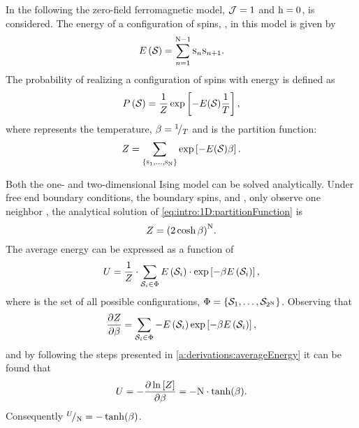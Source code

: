 	In the following the zero-field ferromagnetic model, \ie \mbox{$\mathcal{J} = 1$} and \mbox{$\mathrm{h} = 0$}, is considered. The energy \energy of a configuration of spins, \configuration{}, in this model is given by 
	\begin{equation*}
		E\left(\mathcal{S}_{}\right) = \sum_{n = 1}^{\mathrm{N} - 1}\textsc{s}_{n}\textsc{s}_{n+1}.
	\end{equation*}
	The probability of realizing a configuration of spins \configuration{} with energy \energy is defined as
	\begin{equation}
		\label{eq:intro:1D:configurationProbability}
		P\left(\mathcal{S}_{}\right) = 
		\frac{1}{Z} \exp\left[-{E(\mathcal{S}_{})}\frac{1}{T}\right],
	\end{equation}
	where \temperature represents the temperature, $\beta = {}^{1}\!/_{T}$ and \partitionfunction is the partition function:
	\begin{equation}
		\label{eq:intro:1D:partitionFunction}
		Z = \sum_{\left\{\textsc{s}_{1}, \dotsc, \textsc{s}_{\mathrm{N}} \right\}} \exp\left[- {E(\mathcal{S}_{})} \beta \right].
	\end{equation}

	Both the one- and two-dimensional Ising model can be solved analytically. Under free end boundary conditions, \ie the boundary spins,  and \spin{\numberOfSpins}, only observe one neighbor \cite{landau2014guide}, the analytical solution of \cref{eq:intro:1D:partitionFunction} is
	\begin{equation}
		\label{eq:introduced1D:partitionFunctionAnalyticalSolution}
		Z = {(2 \cosh \beta)}^\mathrm{N}.
	\end{equation}
	The average energy can be expressed as a function of \partitionfunction \cite{Murray20011Handout}
	\begin{equation*}
		U = \frac{1}{Z} \cdot \sum_{\mathcal{S}_{i} \in \Phi} E\left(\mathcal{S}_{i}\right) \cdot \exp\left[-\beta E\left(\mathcal{S}_{i}\right) \right],
	\end{equation*} 
	where \allPossibleConfigurations is the set of all possible configurations, \ie $\Phi = \left\{\mathcal{S}_{1}, \dotsc, \mathcal{S}_{2^\mathrm{N}}\right\}$. Observing that
	\begin{equation*}
		\frac{\partial Z}{\partial \beta} = \sum_{\mathcal{S}_{i} \in \Phi} - E\left(\mathcal{S}_{i}\right) \exp\left[-\beta E\left(\mathcal{S}_{i}\right) \right],
	\end{equation*}
	and by following the steps presented in \cref{a:derivations:averageEnergy} it can be found that
	\begin{equation*}
		U = - \frac{\partial \ln \left[ Z \right]}{\partial \beta} = - \mathrm{N} \cdot \tanh (\beta).
	\end{equation*}
	Consequently ${}^{U}\!/_{\mathrm{N}} = - \tanh (\beta)$.

